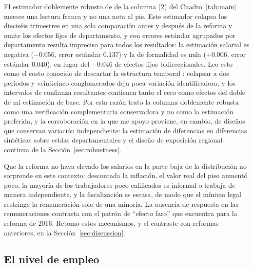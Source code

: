 El estimador doblemente robusto de \citet{santanna_zhao_2020} de la columna (2) del Cuadro~\ref{tab:main} merece una lectura franca y no una nota al pie. Este estimador colapsa los dieciséis trimestres en una sola comparación antes y después de la reforma y omite los efectos fijos de departamento, y con errores estándar agrupados por departamento resulta impreciso para todos los resultados: la estimación salarial es negativa ($-0.056$, error estándar $0.137$) y la de formalidad es nula ($+0.006$, error estándar $0.040$), en lugar del $-0.046$ de efectos fijos bidireccionales. Leo esto como el costo conocido de descartar la estructura temporal \citep{bertrand_2004}: colapsar a dos periodos y veinticinco conglomerados deja poca variación identificadora, y los intervalos de confianza resultantes contienen tanto el cero como efectos del doble de mi estimación de base. Por esta razón trato la columna doblemente robusta como una verificación complementaria conservadora y no como la estimación preferida, y la corroboración en la que me apoyo proviene, en cambio, de diseños que conservan variación independiente: la estimación de diferencias en diferencias sintéticas sobre celdas departamentales y el diseño de exposición regional continua de la Sección~\ref{sec:robustness}.

Que la reforma no haya elevado los salarios en la parte baja de la distribución no sorprende en este contexto: descontada la inflación, el valor real del piso aumentó poco, la mayoría de los trabajadores poco calificados es informal o trabaja de manera independiente, y la fiscalización es escasa, de modo que el mínimo legal restringe la remuneración solo de una minoría. La ausencia de respuesta en las remuneraciones contrasta con el patrón de ``efecto faro'' que \citet{jimenez_2023} encuentra para la reforma de 2016. Retomo estos mecanismos, y el contraste con reformas anteriores, en la Sección~\ref{sec:discussion}.


\subsection{El nivel de empleo}

